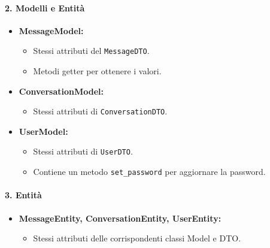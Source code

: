     \paragraph{2. Modelli e Entità}
    \begin{itemize}
        \item \textbf{MessageModel:}
        \begin{itemize}
            \item Stessi attributi del \texttt{MessageDTO}.
            \item Metodi getter per ottenere i valori.
        \end{itemize}
        \item \textbf{ConversationModel:}
        \begin{itemize}
            \item Stessi attributi di \texttt{ConversationDTO}.
        \end{itemize}
        \item \textbf{UserModel:}
        \begin{itemize}
            \item Stessi attributi di \texttt{UserDTO}.
            \item Contiene un metodo \texttt{set\_password} per aggiornare la password.
        \end{itemize}
    \end{itemize}

    \paragraph{3. Entità}
    \begin{itemize}
        \item \textbf{MessageEntity, ConversationEntity, UserEntity:}
        \begin{itemize}
            \item Stessi attributi delle corrispondenti classi Model e DTO.
        \end{itemize}
    \end{itemize}

